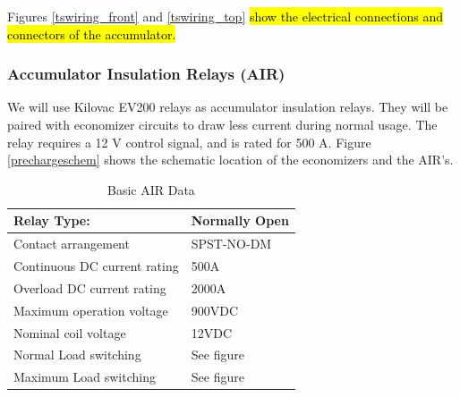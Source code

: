 \documentclass{article}
\DeclareRobustCommand{\hlr}[1]{{\sethlcolor{red}\hl{#1}}}
\begin{document}
            Figures \ref{tswiring_front} and \ref{tswiring_top} \hlr{show the electrical connections and connectors of the accumulator. }

        \subsubsection{Accumulator Insulation Relays (AIR)} \label{airs}


            We will use Kilovac EV200 relays as accumulator insulation relays. They will be paired with economizer circuits to draw less current during normal usage. The relay requires a 12 V control signal, and is rated for 500 A. Figure \ref{prechargeschem} shows the schematic location of the economizers and the AIR's.

            \begin{table}[H]
                \centering
                \begin{tabular}{|l|l|}
                    \hline
                    Relay Type: & Normally Open \\ \hline
                    Contact arrangement & SPST-NO-DM \\ \hline
                    Continuous DC current rating & 500A \\ \hline
                    Overload DC current rating & 2000A \\ \hline
                    Maximum operation voltage & 900VDC \\ \hline
                    Nominal coil voltage & 12VDC \\ \hline
                    Normal Load switching & See figure \\ \hline
                    Maximum Load switching & See figure \\ \hline
                \end{tabular}
                \caption{Basic AIR Data}
                \label{air}
            \end{table}
\end{document}
